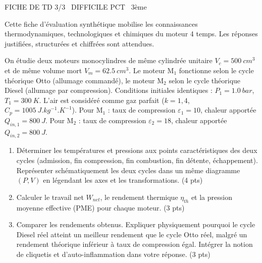 \documentclass[11pt]{article}
\begin{document}
\begin{tcolorbox}[enhanced,colback=popink,colframe=popink,arc=10pt,boxrule=0pt,left=12pt,right=12pt,top=9pt,bottom=9pt]
{\color{white}\popxbold\small FICHE DE TD 3/3 \textbullet\ DIFFICILE \hfill PCT \textbullet\ 3ème\par}
\end{tcolorbox}
\vspace{4pt}
Cette fiche d'évaluation synthétique mobilise les connaissances thermodynamiques, technologiques et chimiques du moteur 4 temps. Les réponses justifiées, structurées et chiffrées sont attendues.

\begin{exercice}
On étudie deux moteurs monocylindres de même cylindrée unitaire $V_c = \SI{500}{cm^3}$ et de même volume mort $V_m = \SI{62,5}{cm^3}$. Le moteur M$_1$ fonctionne selon le cycle théorique Otto (allumage commandé), le moteur M$_2$ selon le cycle théorique Diesel (allumage par compression). Conditions initiales identiques : $P_1 = \SI{1,0}{bar}$, $T_1 = \SI{300}{K}$. L'air est considéré comme gaz parfait ($k=1,4$, $C_p = \SI{1005}{J.kg^{-1}.K^{-1}}$). Pour M$_1$ : taux de compression $\varepsilon_1 = 10$, chaleur apportée $Q_{in,1} = \SI{800}{J}$. Pour M$_2$ : taux de compression $\varepsilon_2 = 18$, chaleur apportée $Q_{in,2} = \SI{800}{J}$.
\begin{enumerate}
    \item Déterminer les températures et pressions aux points caractéristiques des deux cycles (admission, fin compression, fin combustion, fin détente, échappement). Représenter schématiquement les deux cycles dans un même diagramme $(P,V)$ en légendant les axes et les transformations. (4 pts)
    \item Calculer le travail net $W_{net}$, le rendement thermique $\eta_{th}$ et la pression moyenne effective (PME) pour chaque moteur. (3 pts)
    \item Comparer les rendements obtenus. Expliquer physiquement pourquoi le cycle Diesel réel atteint un meilleur rendement que le cycle Otto réel, malgré un rendement théorique inférieur à taux de compression égal. Intégrer la notion de cliquetis et d'auto-inflammation dans votre réponse. (3 pts)
\end{enumerate}
\end{exercice}
\end{document}
